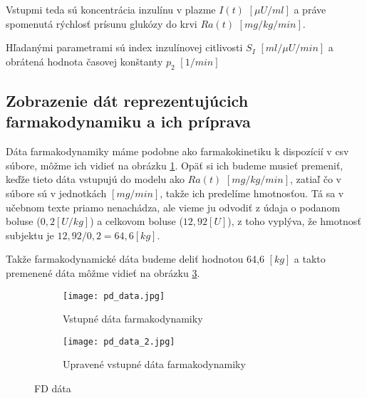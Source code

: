 \documentclass[11pt]{article} %
\begin{document}
Vstupmi teda sú koncentrácia inzulínu v plazme $I(t)$ $[\mu U/ml]$ a práve spomenutá rýchlosť prísunu glukózy do krvi $Ra(t)$ $[mg/kg/min]$.

Hľadanými parametrami sú index inzulínovej citlivosti $S_I$ $[ml/\mu U/min]$ a obrátená hodnota časovej konštanty $p_2$ $[1/min]$

 

\subsection{Zobrazenie dát reprezentujúcich farmakodynamiku a ich príprava}

Dáta farmakodynamiky máme podobne ako farmakokinetiku k dispozícií v csv súbore, môžme ich vidieť na obrázku \ref{fig:pd_data_1}. 
Opäť si ich budeme musieť premeniť, keďže tieto dáta vstupujú do modelu ako $Ra(t)$ $[mg/kg/min]$, zatiaľ čo v súbore sú v jednotkách $[mg/min]$, takže ich predelíme hmotnosťou. Tá sa v učebnom texte priamo nenachádza, ale vieme ju odvodiť z údaja o podanom boluse ($0,2 [U/kg]$) a celkovom boluse ($12,92 [U]$), z toho vyplýva, že hmotnosť subjektu je $12,92 / 0,2 = 64,6 [kg]$.

Takže farmakodynamické dáta budeme deliť hodnotou 64,6 $[kg]$ a takto premenené dáta môžme vidieť na obrázku \ref{fig:pd_data_2}.%


\begin{figure} %
\begin{subfigure}{.5\textwidth}
	\centering
	\texttt{[image: pd\_data.jpg]} %
	\caption{Vstupné dáta farmakodynamiky}
	\label{fig:pd_data_1}
\end{subfigure}
\begin{subfigure}{.5\textwidth}
	\centering
	\texttt{[image: pd\_data\_2.jpg]} %
	\caption{Upravené vstupné dáta farmakodynamiky}
	\label{fig:pd_data_2}
\end{subfigure}
\caption{FD dáta}
\end{figure}
\end{document}
